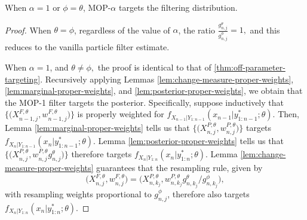 \begin{prop}
    When $\alpha=1$ or $\phi=\theta$, MOP-$\alpha$ targets the filtering distribution. 
\end{prop}
\begin{proof}
    When $\theta=\phi$, regardless of the value of $\alpha$, the ratio $\frac{g_{n,j}^\theta}{g_{n,j}^\phi}=1,$ and this reduces to the vanilla particle filter estimate.

    When $\alpha=1$, and $\theta\neq\phi,$ the proof is identical to that of \ref{thm:off-parameter-targeting}. Recursively applying Lemmas \ref{lem:change-measure-proper-weights}, \ref{lem:marginal-proper-weights}, and \ref{lem:posterior-proper-weights}, we obtain that 
    the MOP-1 filter targets the posterior.
    Specifically, suppose inductively that $\big\{\big(X^{F,\theta}_{n-1,j},w^{F,\theta}_{n-1,j}\big)\big\}$ is properly weighted for $f_{X_{n-1}|Y_{1:n-1}}(x_{n-1}|y^*_{1:n-1};\theta)$.
    Then, Lemma \ref{lem:marginal-proper-weights} tells us that $\big\{\big(X^{P,\theta}_{n,j},w^{P,\theta}_{n,j}\big)\big\}$ targets $f_{X_{n}|Y_{1:n-1}}(x_{n}|y^*_{1:n-1};\theta)$.
    Lemma \ref{lem:posterior-proper-weights} tells us that $\big\{\big(X^{P,\theta}_{n,j},w^{P,\theta}_{n,j} g^\theta_{n,j} \big)\big\}$ therefore targets  $f_{X_{n}|Y_{1:n}}(x_{n}|y^*_{1:n};\theta)$.
    Lemma \ref{lem:change-measure-proper-weights} guarantees that the resampling rule, given by 
    \begin{equation}
    \big(X^{F,\theta}_{n,j},w^{F,\theta}_{n,j}\big) = \big(X^{P,\theta}_{n,k_j}, w^{P,\theta}_{n,k_j} g^\theta_{n,k_j}\big/ g^\phi_{n,k_j}\big),
    \end{equation}
    with resampling weights proportional to $g^\phi_{n,j}$, therefore also targets $f_{X_{n}|Y_{1:n}}(x_{n}|y^*_{1:n};\theta)$.
\end{proof}


